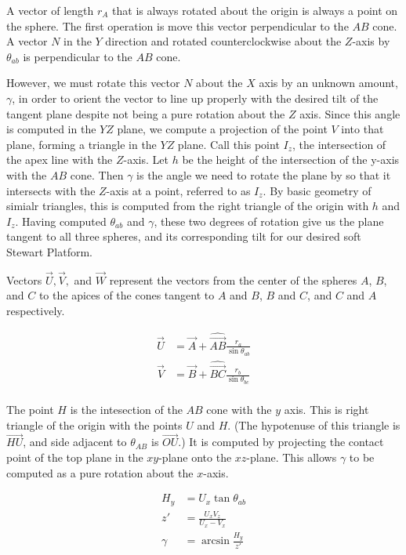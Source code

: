 \documentclass{article}
\begin{document}
A vector of length $r_A$ that is always rotated about the origin is always a point on the sphere.
The first operation is move this vector perpendicular to the $AB$ cone.
A vector $N$ in the $Y$ direction and rotated counterclockwise
about the $Z$-axis by $\theta_{ab}$ is perpendicular to the $AB$ cone.

However, we must rotate this vector $N$ about the $X$ axis by an unknown amount, $\gamma$, in order
to orient the vector to line up properly with the desired tilt of the tangent plane despite not being a pure rotation about the $Z$ axis. Since this angle is computed in the $YZ$ plane, we compute a projection of the point $V$ into
that plane, forming a triangle in the $YZ$ plane.  Call this point $I_z$, the intersection
of the apex line with the $Z$-axis. Let $h$ be the height of the intersection of the y-axis with the $AB$ cone.
Then $\gamma$ is the angle we need to rotate the plane by so that it intersects with the $Z$-axis at a point, referred to as $I_z$. By basic geometry of simialr triangles, this is computed from the right triangle of the origin with $h$ and $I_z$.
Having computed $\theta_{ab}$ and $\gamma$, these two degrees of rotation give us the plane tangent to all three spheres, and its corresponding tilt for our desired soft Stewart Platform.

Vectors $\overrightarrow{U}, \overrightarrow{V}, $ and $  \overrightarrow{W}$ represent the vectors from the center of the spheres $A$, $B$, and $C$ to
the apices of the cones tangent to $A$ and $B$, $B$ and $C$, and $C$ and $A$ respectively.


\begin{align}
  \overrightarrow{U} &= \overrightarrow{A} + \hat{\overrightarrow{AB}} \frac{r_a}{\sin{\theta_{ab}}} \\
  \overrightarrow{V} &= \overrightarrow{B} + \hat{\overrightarrow{BC}} \frac{r_b}{\sin{\theta_{bc}}} \\
\end{align}

The point $H$ is the intesection of the $AB$ cone with the $y$ axis.
This is right triangle of the origin with the points $U$ and $H$. (The hypotenuse
of this triangle is $\overrightarrow{HU}$, and side adjacent to $\theta_{AB}$ is $\overrightarrow{OU}$.)
It is computed by projecting the contact point of the top plane in the $xy$-plane
onto the $xz$-plane. This allows $\gamma$ to be computed as a pure rotation
about the $x$-axis.

\begin{align}
H_y &= U_x\tan{\theta_{ab}}\\
z' &= \frac{U_xV_z}{U_x - V_x} \\
\gamma &= \arcsin{\frac{H_y}{z'}} \label{eq:gamma}
\end{align}
\end{document}
